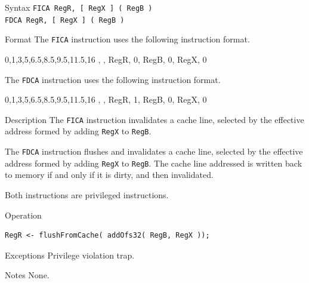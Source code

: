 %
%
\pagebreak
{}

\begin{iPageDescEntry}{Syntax}
	\texttt{FICA RegR, [ RegX ] ( RegB )} \\
	\texttt{FDCA RegR, [ RegX ] ( RegB )}
\end{iPageDescEntry}

\begin{iPageDescEntry}{Format}
 	The \texttt{FICA} instruction uses the following instruction format. \\
    \begin{flushleft}
    \drawInstrFormat
        {0,1,3,5,6.5,8.5,9.5,11.5,16}
        {\OpCodeGrpSYS, \OpCodePCA, RegR, 0, RegB, 0, RegX, 0}
    \end{flushleft}
    The \texttt{FDCA} instruction uses the following instruction format. \\
    \begin{flushleft}
    \drawInstrFormat
        {0,1,3,5,6.5,8.5,9.5,11.5,16}
        {\OpCodeGrpSYS, \OpCodePCA, RegR, 1, RegB, 0, RegX, 0}
    \end{flushleft}
\end{iPageDescEntry}

\begin{iPageDescEntry}{Description}        
    The \texttt{FICA} instruction invalidates a cache line, selected by the effective address formed by adding \texttt{RegX} to \texttt{RegB}. 
    
    The \texttt{FDCA} instruction flushes and invalidates a cache line, selected by the effective address formed by adding \texttt{RegX} to \texttt{RegB}. The cache line addressed is written back to memory if and only if it is dirty, and then invalidated. 

    Both instructions are privileged instructions.
\end{iPageDescEntry}

\begin{iPageDescOpEntry}{Operation}
\begin{lstlisting}[style=iPageOpStyle]
RegR <- flushFromCache( addOfs32( RegB, RegX ));
\end{lstlisting}
\end{iPageDescOpEntry}

\begin{iPageDescEntry}{Exceptions}
    Privilege violation trap.
\end{iPageDescEntry}

\begin{iPageDescEntry}{Notes}
None.
\end{iPageDescEntry} 
